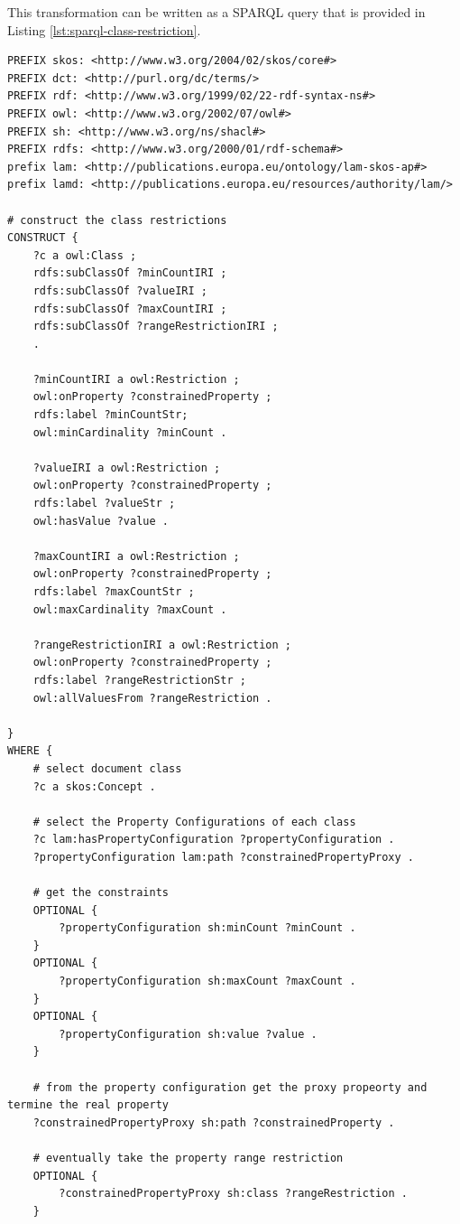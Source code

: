 	This transformation can be written as a SPARQL query that is provided in Listing \ref{lst:sparql-class-restriction}.  
	
	\begin{lstlisting}[language=SPARQL, captionpos=b, caption={The transformation SPARQL query for LAM legal document class restrictions}, label=lst:sparql-class-restriction]
PREFIX skos: <http://www.w3.org/2004/02/skos/core#>
PREFIX dct: <http://purl.org/dc/terms/>
PREFIX rdf: <http://www.w3.org/1999/02/22-rdf-syntax-ns#>
PREFIX owl: <http://www.w3.org/2002/07/owl#>
PREFIX sh: <http://www.w3.org/ns/shacl#>
PREFIX rdfs: <http://www.w3.org/2000/01/rdf-schema#>
prefix lam: <http://publications.europa.eu/ontology/lam-skos-ap#>
prefix lamd: <http://publications.europa.eu/resources/authority/lam/>

# construct the class restrictions
CONSTRUCT { 
	?c a owl:Class ;
	rdfs:subClassOf ?minCountIRI ;
	rdfs:subClassOf ?valueIRI ;
	rdfs:subClassOf ?maxCountIRI ;
	rdfs:subClassOf ?rangeRestrictionIRI ;
	.
	
	?minCountIRI a owl:Restriction ;
	owl:onProperty ?constrainedProperty ;    
	rdfs:label ?minCountStr;
	owl:minCardinality ?minCount .
	
	?valueIRI a owl:Restriction ;
	owl:onProperty ?constrainedProperty ;
	rdfs:label ?valueStr ;
	owl:hasValue ?value .
	
	?maxCountIRI a owl:Restriction ;
	owl:onProperty ?constrainedProperty ;
	rdfs:label ?maxCountStr ;
	owl:maxCardinality ?maxCount .
	
	?rangeRestrictionIRI a owl:Restriction ;
	owl:onProperty ?constrainedProperty ;	
	rdfs:label ?rangeRestrictionStr ;
	owl:allValuesFrom ?rangeRestriction .
	
} 
WHERE { 
	# select document class
	?c a skos:Concept . 
	
	# select the Property Configurations of each class
	?c lam:hasPropertyConfiguration ?propertyConfiguration .  
	?propertyConfiguration lam:path ?constrainedPropertyProxy .
	
	# get the constraints
	OPTIONAL {
		?propertyConfiguration sh:minCount ?minCount .
	}
	OPTIONAL {
		?propertyConfiguration sh:maxCount ?maxCount .
	}
	OPTIONAL {
		?propertyConfiguration sh:value ?value .
	}	
	
	# from the property configuration get the proxy propeorty and termine the real property
	?constrainedPropertyProxy sh:path ?constrainedProperty .  
	
	# eventually take the property range restriction
	OPTIONAL {
		?constrainedPropertyProxy sh:class ?rangeRestriction .
	}
	

\end{lstlisting}
